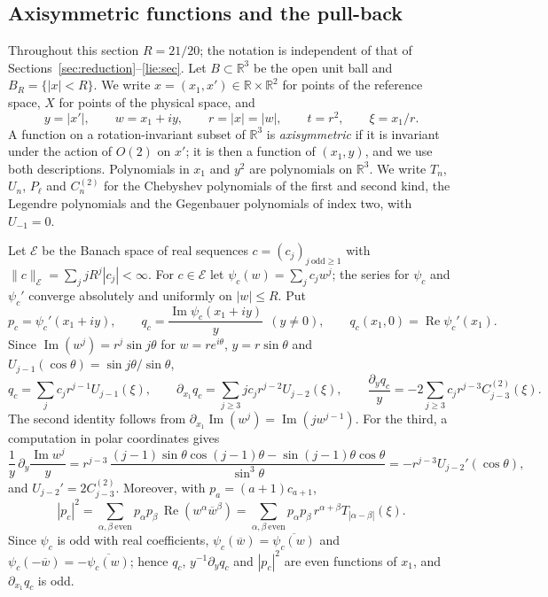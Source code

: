 \documentclass[11pt]{amsart}
\theoremstyle{definition}
\theoremstyle{remark}
\numberwithin{equation}{section}
\newcommand{\R}{\mathbb{R}}
\newcommand{\bw}{\overline{w}}
\DeclareMathOperator{\re}{Re}
\DeclareMathOperator{\im}{Im}
\newcommand{\nrm}[1]{\lVert #1\rVert}
\begin{document}
\subsection{Axisymmetric functions and the pull-back}\label{r3:sec-pullback}

Throughout this section $R=21/20$; the notation is independent of that of Sections~\ref{sec:reduction}--\ref{lie:sec}. Let $B\subset\R^3$ be the open unit ball and $B_R=\{|x|<R\}$. We write $x=(x_1,x')\in\R\times\R^2$ for points of the reference space, $X$ for points of the physical space, and
\[
y=|x'|,\qquad w=x_1+iy,\qquad r=|x|=|w|,\qquad t=r^2,\qquad \xi=x_1/r .
\]
A function on a rotation-invariant subset of $\R^3$ is \emph{axisymmetric} if it is invariant under the action of $O(2)$ on $x'$; it is then a function of $(x_1,y)$, and we use both descriptions. Polynomials in $x_1$ and $y^2$ are polynomials on $\R^3$. We write $T_n$, $U_n$, $P_\ell$ and $C^{(2)}_n$ for the Chebyshev polynomials of the first and second kind, the Legendre polynomials and the Gegenbauer polynomials of index two, with $U_{-1}=0$.

Let $\mathcal E$ be the Banach space of real sequences $c=(c_j)_{j\ \mathrm{odd}\geq1}$ with $\nrm c_{\mathcal E}=\sum_jjR^j|c_j|<\infty$. For $c\in\mathcal E$ let $\psi_c(w)=\sum_jc_jw^j$; the series for $\psi_c$ and $\psi_c'$ converge absolutely and uniformly on $|w|\leq R$. Put
\[
p_c=\psi_c'(x_1+iy),\qquad q_c=\frac{\im\psi_c(x_1+iy)}{y}\ \ (y\neq0),\qquad q_c(x_1,0)=\re\psi_c'(x_1).
\]
Since $\im(w^j)=r^j\sin j\theta$ for $w=re^{i\theta}$, $y=r\sin\theta$ and $U_{j-1}(\cos\theta)=\sin j\theta/\sin\theta$,
\begin{equation}\label{r3:eq-qseries}
q_c=\sum_jc_jr^{j-1}U_{j-1}(\xi),\qquad \partial_{x_1}q_c=\sum_{j\geq3}jc_jr^{j-2}U_{j-2}(\xi),\qquad \frac{\partial_yq_c}y=-2\sum_{j\geq3}c_jr^{j-3}C^{(2)}_{j-3}(\xi).
\end{equation}
The second identity follows from $\partial_{x_1}\im(w^j)=\im(jw^{j-1})$. For the third, a computation in polar coordinates gives
\[
\frac1y\,\partial_y\frac{\im w^j}{y}=r^{j-3}\,\frac{(j-1)\sin\theta\cos(j-1)\theta-\sin(j-1)\theta\cos\theta}{\sin^3\theta}=-r^{j-3}U_{j-2}'(\cos\theta),
\]
and $U_{j-2}'=2C^{(2)}_{j-3}$. Moreover, with $p_a=(a+1)c_{a+1}$,
\begin{equation}\label{r3:eq-p2}
|p_c|^2=\sum_{\alpha,\beta\ \mathrm{even}}p_\alpha p_\beta\,\re(w^\alpha\bw^\beta)=\sum_{\alpha,\beta\ \mathrm{even}}p_\alpha p_\beta\,r^{\alpha+\beta}T_{|\alpha-\beta|}(\xi).
\end{equation}
Since $\psi_c$ is odd with real coefficients, $\psi_c(\bw)=\overline{\psi_c(w)}$ and $\psi_c(-\bw)=-\overline{\psi_c(w)}$; hence $q_c$, $y^{-1}\partial_yq_c$ and $|p_c|^2$ are even functions of $x_1$, and $\partial_{x_1}q_c$ is odd.
\end{document}
